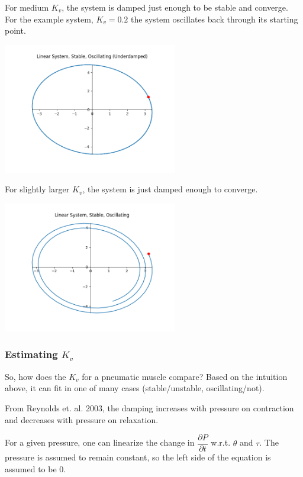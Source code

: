 \documentclass[12pt, letterpaper, oneside, notitlepage, onecolumn]{article}
\begin{document}
For medium $K_{v}$, the system is damped just enough to be stable and
converge. For the example system, $K_{v} = 0.2$ the system oscillates back
through its starting point.

\begin{center}
\includegraphics[width=3in,angle=0]{linear_pd_circleV}
\end{center}

For slightly larger $K_{v}$, the system is just damped enough to converge.

\begin{center}
\includegraphics[width=3in,angle=0]{linear_pd_mediumV}
\end{center}

\subsubsection{Estimating $K_{v}$}

So, how does the $K_{v}$ for a pneumatic muscle compare? Based on the intuition
above, it can fit in one of many cases (stable/unstable, oscillating/not).

From Reynolds et. al. 2003, the damping increases with pressure on contraction
and decreases with pressure on relaxation. 

For a given pressure, one can linearize the change in $\dfrac{\partial
P}{\partial t}$ w.r.t. $\theta$ and $\tau$. The pressure is assumed to remain
constant, so the left side of the equation is assumed to be 0.

\end{document}
